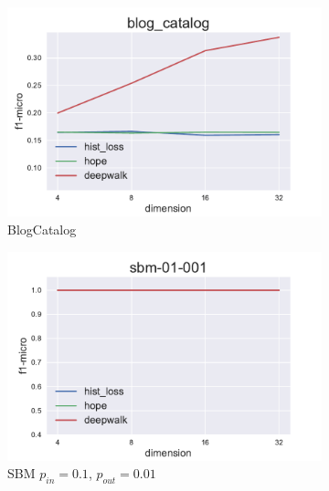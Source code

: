 \documentclass[12pt,a4paper]{extarticle}
\begin{document}
    \begin{figure}
    \begin{subfigure}{.5\linewidth}
    \centering
    \includegraphics[width=\linewidth]{src/images/Node_classification_blog_catalog.pdf}
    \caption{BlogCatalog}
    \label{fig:clas_blog}
    \end{subfigure}
    \begin{subfigure}{.5\linewidth}
    \centering
    \includegraphics[width=\linewidth]{src/images/Node_classification_sbm-01-001.pdf}
    \caption{SBM $p_{in}=0.1$, $p_{out}=0.01$}
    \label{fig:clas_sbm1}
    \end{subfigure}
    \\[1ex]
    \begin{subfigure}{.5\linewidth}
    \centering

\end{subfigure}
\end{figure}
\end{document}
